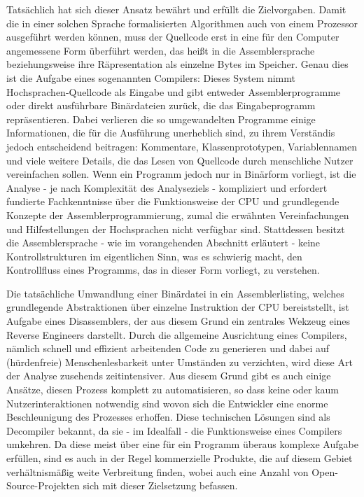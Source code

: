 \documentclass[11pt]{article}
\begin{document}
Tatsächlich hat sich dieser Ansatz bewährt und erfüllt die Zielvorgaben. Damit die in einer solchen
Sprache formalisierten Algorithmen auch von einem Prozessor ausgeführt werden können, muss der Quellcode
erst in eine für den Computer angemessene Form überführt werden, das heißt in die Assemblersprache
beziehungsweise ihre Räpresentation als einzelne Bytes im Speicher. Genau dies ist die Aufgabe eines
sogenannten Compilers: Dieses System nimmt Hochsprachen-Quellcode als Eingabe und gibt entweder
Assemblerprogramme oder direkt ausführbare Binärdateien zurück, die das Eingabeprogramm
repräsentieren. Dabei verlieren die so umgewandelten Programme einige Informationen, die für
die Ausführung unerheblich sind, zu ihrem Verständis jedoch entscheidend beitragen: Kommentare,
Klassenprototypen, Variablennamen und viele weitere Details, die das Lesen von Quellcode durch menschliche
Nutzer vereinfachen sollen. Wenn ein Programm jedoch nur in Binärform vorliegt,
ist die Analyse - je nach Komplexität des Analyseziels - kompliziert und
erfordert fundierte Fachkenntnisse über die Funktionsweise der CPU und grundlegende Konzepte der
Assemblerprogrammierung, zumal die erwähnten Vereinfachungen und Hilfestellungen der Hochsprachen
nicht verfügbar sind. Stattdessen besitzt die Assemblersprache - wie im vorangehenden Abschnitt
erläutert - keine Kontrollstrukturen im eigentlichen Sinn, was es schwierig macht,
den Kontrollfluss eines Programms, das in dieser Form vorliegt, zu verstehen.

Die tatsächliche
Umwandlung einer Binärdatei in ein Assemblerlisting, welches grundlegende Abstraktionen über
einzelne Instruktion der CPU bereiststellt, ist Aufgabe eines Disassemblers, der aus diesem Grund
ein zentrales Wekzeug eines Reverse Engineers darstellt. Durch die allgemeine Ausrichtung eines
Compilers, nämlich schnell und effizient arbeitenden Code zu generieren und dabei auf (hürdenfreie)
Menschenlesbarkeit unter Umständen zu verzichten, wird diese Art der Analyse zusehends zeitintensiver.
Aus diesem Grund gibt es auch einige Ansätze, diesen Prozess komplett zu automatisieren, so dass
keine oder kaum Nutzerinteraktionen notwendig sind wovon sich die Entwickler eine enorme Beschleunigung
des Prozesses erhoffen. Diese technischen Lösungen sind als Decompiler bekannt, da sie - im
Idealfall - die Funktionsweise eines Compilers umkehren. Da diese meist über eine für ein Programm
überaus komplexe Aufgabe erfüllen, sind es auch in der Regel kommerzielle Produkte, die auf diesem
Gebiet verhältnismäßig weite Verbreitung finden, wobei auch eine Anzahl von Open-Source-Projekten
sich mit dieser Zielsetzung befassen.
\end{document}
